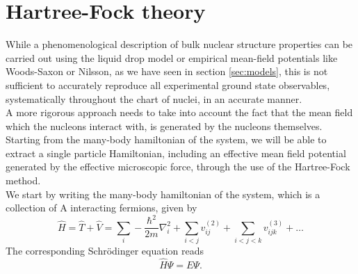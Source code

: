 \section{Hartree-Fock theory}
While a phenomenological description of bulk nuclear structure properties can be carried out using the liquid drop model or empirical mean-field potentials like Woods-Saxon or Nilsson, as we have seen in section \ref{sec:models}, this is not sufficient to accurately reproduce all experimental ground state observables, systematically throughout the chart of nuclei, in an accurate manner. 
\\A more rigorous approach needs to take into account the fact that the mean field which the nucleons interact with, is generated by the nucleons themselves.
Starting from the many-body hamiltonian of the system, we will be able to extract a single particle Hamiltonian, including an effective mean field potential generated by the effective microscopic force, through the use of the Hartree-Fock method.
\\We start by writing the many-body hamiltonian of the system, which is a collection of A interacting fermions, given by
\begin{equation}
    \label{eq:mb_hamiltonian}
    \hat H = \hat T + \hat V = \sum_i -\frac{\hbar^2}{2m}\nabla^2_i + \sum_{i<j} v^{(2)}_{ij} + \sum_{i<j<k} v^{(3)}_{ijk }+\ldots
\end{equation}
The corresponding Schr\"odinger equation reads
\begin{equation}
    \label{eq:many_body_schrodinger}
    \hat H \Psi = E\Psi.
\end{equation}

